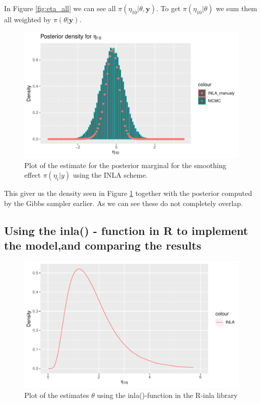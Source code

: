 In Figure \ref{fig:eta_all} we can see all $\pi(\eta_{10}|\theta, \boldsymbol{y})$. To get  $\pi(\eta_{10}|\theta)$ we sum them all weighted by $\pi(\theta|\boldsymbol{y})$. 

\begin{figure}[h!]
    \centering
    \includegraphics[width=\textwidth]{Images/post_eta_inla.pdf}
    \caption{Plot of the estimate for the posterior marginal for the smoothing effect $\pi(\eta_i|y)$ using the INLA scheme.}
    \label{fig:post_eta_inla}
\end{figure}

This giver us the density seen in Figure \ref{fig:post_eta_inla} together with the posterior computed by the Gibbs sampler earlier. As we can see these do not completely overlap. 

\subsection{Using the inla() - function in R to implement the model,and comparing the results}


\begin{figure}[h]
    \centering
    \includegraphics{Images/R_inla_theta.pdf}
    \caption{Plot of the estimates $\theta$ using the inla()-function in the R-inla library}
    \label{fig:r_inla_theta}
\end{figure}

